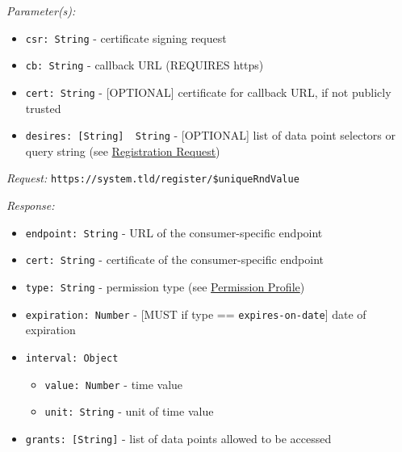 \documentclass[12pt,english,a4paper,titlepage,cleardoublepage=empty,dottedtoc]{report}
\newenvironment{Shaded}{\begin{snugshade}}{\end{snugshade}}
\newcommand{\DataTypeTok}[1]{\textcolor[rgb]{0.13,0.29,0.53}{#1}}
\newcommand{\StringTok}[1]{\textcolor[rgb]{0.31,0.60,0.02}{#1}}
\newcommand{\OtherTok}[1]{\textcolor[rgb]{0.56,0.35,0.01}{#1}}
\newcommand{\FunctionTok}[1]{\textcolor[rgb]{0.00,0.00,0.00}{#1}}
\providecommand{\tightlist}{%
  \setlength{\itemsep}{0pt}\setlength{\parskip}{0pt}}
\begin{document}
\emph{Parameter(s):}

\begin{itemize}
\tightlist
\item
  \texttt{csr:\ String} - certificate signing request
\item
  \texttt{cb:\ String} - callback URL (REQUIRES https)
\item
  \texttt{cert:\ String} - {[}OPTIONAL{]} certificate for callback URL,
  if not publicly trusted
\item
  \texttt{desires:\ {[}String{]}\ \textbar{}\textbar{}\ String} -
  {[}OPTIONAL{]} list of data point selectors or query string (see
  \protect\hyperlink{spec_api_permission-request}{Registration Request})
\end{itemize}

\emph{Request:} \texttt{https://system.tld/register/\$uniqueRndValue}

\begin{Shaded}
\end{Shaded}

\emph{Response:}

\begin{itemize}
\tightlist
\item
  \texttt{endpoint:\ String} - URL of the consumer-specific endpoint
\item
  \texttt{cert:\ String} - certificate of the consumer-specific endpoint
\item
  \texttt{type:\ String} - permission type (see
  \protect\hyperlink{permission-profile}{Permission Profile})
\item
  \texttt{expiration:\ Number} - {[}MUST if type ==
  \texttt{expires-on-date\textquotesingle{}}{]} date of expiration
\item
  \texttt{interval:\ Object}

  \begin{itemize}
  \tightlist
  \item
    \texttt{value:\ Number} - time value
  \item
    \texttt{unit:\ String} - unit of time value
  \end{itemize}
\item
  \texttt{grants:\ {[}String{]}} - list of data points allowed to be
  accessed
\end{itemize}
\end{document}
